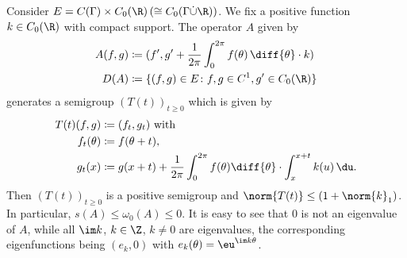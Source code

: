 \begin{example}\label{ex:b3-2.13}
	Consider $E = C(\Gamma) \times C_{0}(\R) \, (\cong C_{0}(\Gamma\dot{\cup}\R))$.
	We fix a positive function $k \in C_{0}(\R)$ with compact support.
	The operator $A$ given by
	\begin{equation}\label{eq:b3-2.20}
		\begin{aligned}
		A(f,g) &\coloneqq (f',g' + \frac{1}{2\pi}\int_{0}^{2\pi} f(\theta) \, \diff{\theta}\cdot k) \\
		D(A) &\coloneqq \{(f,g) \in E \colon f,g \in C^{1}, g' \in C_{0}(\R)\}
		\end{aligned}
	\end{equation}
	generates a semigroup $(T(t))_{t \geq 0}$ which is given by
	\begin{equation}\label{eq:b3-2.21}
		\begin{aligned}
			T(t)(f,g) &\coloneq (f_{t},g_{t}) \text{ with }\\
		   f_{t}(\theta) &\coloneqq f(\theta+t), \\
			g_{t}(x) &\coloneqq g(x+t) + \frac{1}{2\pi}\int_{0}^{2\pi} f(\theta) \diff{\theta}\cdot\int_{x}^{x+t} k(u) \, \du .
		\end{aligned} 
	\end{equation}
	Then $(T(t))_{t \geq 0}$ is a positive semigroup and $\norm{T(t)} \leq (1 + \norm{k}_{1})$.
	In particular, $s(A) \leq \omega_{0}(A) \leq 0$.
	It is easy to see that $0$ is not an eigenvalue of\/ $A$, while all $\im k$, $k \in \Z$, $k \neq 0$ are eigenvalues, the corresponding eigenfunctions being $(e_{k},0)$ with $e_{k}(\theta) = \eu^{\im k\theta}$.
\end{example}
